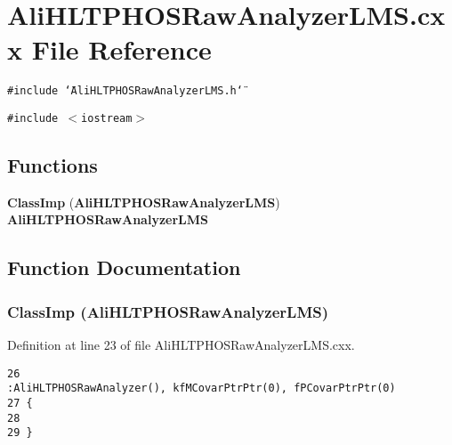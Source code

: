 \section{Ali\-HLTPHOSRaw\-Analyzer\-LMS.cxx File Reference}
\label{AliHLTPHOSRawAnalyzerLMS_8cxx}


{\tt \#include \char`\"{}Ali\-HLTPHOSRaw\-Analyzer\-LMS.h\char`\"{}}\par
{\tt \#include $<$iostream$>$}\par
\subsection*{Functions}
\begin{CompactItemize}
\item 
{\bf Class\-Imp} ({\bf Ali\-HLTPHOSRaw\-Analyzer\-LMS}) {\bf Ali\-HLTPHOSRaw\-Analyzer\-LMS}
\end{CompactItemize}


\subsection{Function Documentation}
\subsubsection{\setlength{\rightskip}{0pt plus 5cm}Class\-Imp ({\bf Ali\-HLTPHOSRaw\-Analyzer\-LMS})}\label{AliHLTPHOSRawAnalyzerLMS_8cxx_a0}




Definition at line 23 of file Ali\-HLTPHOSRaw\-Analyzer\-LMS.cxx.

\footnotesize\begin{verbatim}26                                                                                  :AliHLTPHOSRawAnalyzer(), kfMCovarPtrPtr(0), fPCovarPtrPtr(0)
27 {
28 
29 }
\end{verbatim}\normalsize 


